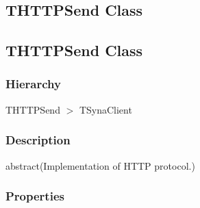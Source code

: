 \documentclass{report}
\begin{document}
\subsection*{\large{\textbf{THTTPSend Class}}\normalsize\hspace{1ex}\hrulefill}
\else
\subsection*{THTTPSend Class}
\fi
\label{httpsend.THTTPSend}
\subsubsection*{\large{\textbf{Hierarchy}}\normalsize\hspace{1ex}\hfill}
THTTPSend {$>$} TSynaClient
\subsubsection*{\large{\textbf{Description}}\normalsize\hspace{1ex}\hfill}
abstract(Implementation of HTTP protocol.)\subsubsection*{\large{\textbf{Properties}}\normalsize\hspace{1ex}\hfill}
\end{document}
